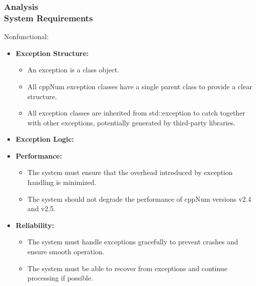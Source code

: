\documentclass[ucs,10pt]{beamer}
\begin{document}
\begin{frame}
\frametitle{Analysis \\
	\small \color{rwth-blue} System Requirements}
	Nonfunctional:
	\begin{itemize}
		\item \textbf{Exception Structure:}
		\begin{itemize}
			\item An exception is a class object.
			\item All cppNum exception classes have a single parent class to provide a clear structure.
			\item All exception classes are inherited from std::exception to catch together with other exceptions, potentially generated by third-party libraries.
		\end{itemize}
             \item \textbf{Exception Logic:}
		\item \textbf{Performance:}
		\begin{itemize}
			\item The system must ensure that the overhead introduced by exception handling is minimized.
			\item The system should not degrade the performance of cppNum versions v2.4 and v2.5.
		\end{itemize}
		\item \textbf{Reliability:}
		\begin{itemize}
			\item The system must handle exceptions gracefully to prevent crashes and ensure smooth operation.
			\item The system must be able to recover from exceptions and continue processing if possible.
		\end{itemize}
        \end{itemize}
\end{frame}
\end{document}
